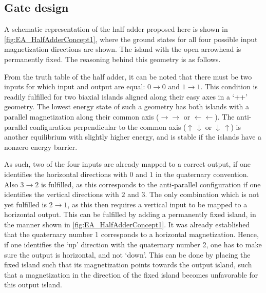 \documentclass[twocolumn]{phdsymp}
\begin{document}
\subsection{Gate design}
A schematic representation of the half adder proposed here is shown in \cref{fig:EA_HalfAdderConcept1}, where the ground states for all four possible input magnetization directions are shown. The island with the open arrowhead is permanently fixed. The reasoning behind this geometry is as follows. \par
From the truth table of the half adder, it can be noted that there must be two inputs for which input and output are equal: $0\rightarrow0$ and $1\rightarrow1$. This condition is readily fulfilled for two biaxial islands aligned along their easy axes in a `++' geometry. The lowest energy state of such a geometry has both islands with a parallel magnetization along their common axis ($\rightarrow \rightarrow$ or $\leftarrow \leftarrow$). The anti-parallel configuration perpendicular to the common axis ($\uparrow~\downarrow$ or $\downarrow~\uparrow$) is another equilibrium with slightly higher energy, and is stable if the islands have a nonzero energy barrier. \par
As such, two of the four inputs are already mapped to a correct output, if one identifies the horizontal directions with $0$ and $1$ in the quaternary convention. Also $3\rightarrow2$ is fulfilled, as this corresponds to the anti-parallel configuration if one identifies the vertical directions with $2$ and $3$. The only combination which is not yet fulfilled is $2\rightarrow1$, as this then requires a vertical input to be mapped to a horizontal output. This can be fulfilled by adding a permanently fixed island, in the manner shown in \cref{fig:EA_HalfAdderConcept1}. It was already established that the quaternary number 1 corresponds to a horizontal magnetization. Hence, if one identifies the `up' direction with the quaternary number 2, one has to make sure the output is horizontal, and not `down'. This can be done by placing the fixed island such that its magnetization points towards the output island, such that a magnetization in the direction of the fixed island becomes unfavorable for this output island.
\end{document}
